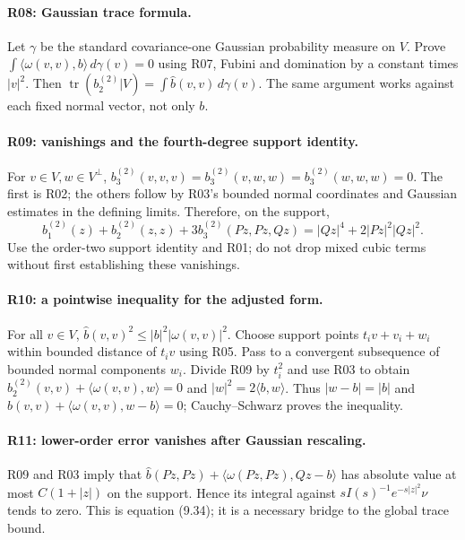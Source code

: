 \paragraph{R08: Gaussian trace formula.}
Let $\gamma$ be the standard covariance-one Gaussian probability measure on
$V$. Prove $\int\langle\omega(v,v),b\rangle\,d\gamma(v)=0$ using R07,
Fubini and domination by a constant times $|v|^2$.
Then
$\operatorname{tr}(b_2^{(2)}|V)=\int\widehat b(v,v)\,d\gamma(v)$.
The same argument works against each fixed normal vector, not only $b$.

\paragraph{R09: vanishings and the fourth-degree support identity.}
For $v\in V,w\in V^\perp$,
$b_3^{(2)}(v,v,v)=b_3^{(2)}(v,w,w)=b_3^{(2)}(w,w,w)=0$.
The first is R02; the others follow by R03's bounded normal coordinates and
Gaussian estimates in the defining limits. Therefore, on the support,
\[
 b_1^{(2)}(z)+b_2^{(2)}(z,z)+3b_3^{(2)}(Pz,Pz,Qz)
 =|Qz|^4+2|Pz|^2|Qz|^2.
\]
Use the order-two support identity and R01; do not drop mixed cubic terms
without first establishing these vanishings.

\paragraph{R10: a pointwise inequality for the adjusted form.}
For all $v\in V$,
$\widehat b(v,v)^2\leq |b|^2|\omega(v,v)|^2$.
Choose support points $t_i v+v_i+w_i$ within bounded distance of $t_i v$ using
R05. Pass to a convergent subsequence of bounded normal components $w_i$.
Divide R09 by $t_i^2$ and use R03 to obtain
$b_2^{(2)}(v,v)+\langle\omega(v,v),w\rangle=0$ and
$|w|^2=2\langle b,w\rangle$.
Thus $|w-b|=|b|$ and
$\widehat b(v,v)+\langle\omega(v,v),w-b\rangle=0$; Cauchy--Schwarz proves
the inequality.

\paragraph{R11: lower-order error vanishes after Gaussian rescaling.}
R09 and R03 imply that
$\widehat b(Pz,Pz)+\langle\omega(Pz,Pz),Qz-b\rangle$
has absolute value at most $C(1+|z|)$ on the support.
Hence its integral against $sI(s)^{-1}e^{-s|z|^2}\nu$ tends to zero.
This is equation (9.34); it is a necessary bridge to the global trace bound.

